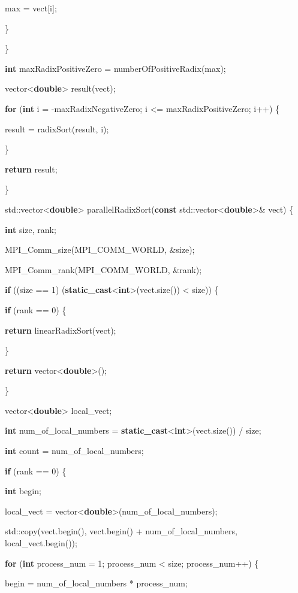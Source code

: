 \documentclass[]{article}
\begin{document}
max = vect{[}i{]};

\}

\}

\textbf{int} maxRadixPositiveZero = numberOfPositiveRadix(max);

vector\textless{}\textbf{double}\textgreater{} result(vect);

\textbf{for} (\textbf{int} i = -maxRadixNegativeZero; i \textless{}=
maxRadixPositiveZero; i++) \{

result = radixSort(result, i);

\}

\textbf{return} result;

\}

std::vector\textless{}\textbf{double}\textgreater{}
parallelRadixSort(\textbf{const}
std::vector\textless{}\textbf{double}\textgreater{}\& vect) \{

\textbf{int} size, rank;

MPI\_Comm\_size(MPI\_COMM\_WORLD, \&size);

MPI\_Comm\_rank(MPI\_COMM\_WORLD, \&rank);

\textbf{if} ((size == 1) \textbar{}\textbar{}
(\textbf{static\_cast}\textless{}\textbf{int}\textgreater{}(vect.size())
\textless{} size)) \{

\textbf{if} (rank == 0) \{

\textbf{return} linearRadixSort(vect);

\}

\textbf{return} vector\textless{}\textbf{double}\textgreater{}();

\}

vector\textless{}\textbf{double}\textgreater{} local\_vect;

\textbf{int} num\_of\_local\_numbers =
\textbf{static\_cast}\textless{}\textbf{int}\textgreater{}(vect.size())
/ size;

\textbf{int} count = num\_of\_local\_numbers;

\textbf{if} (rank == 0) \{

\textbf{int} begin;

local\_vect =
vector\textless{}\textbf{double}\textgreater{}(num\_of\_local\_numbers);

std::copy(vect.begin(), vect.begin() + num\_of\_local\_numbers,
local\_vect.begin());

\textbf{for} (\textbf{int} process\_num = 1; process\_num \textless{}
size; process\_num++) \{

begin = num\_of\_local\_numbers * process\_num;
\end{document}
